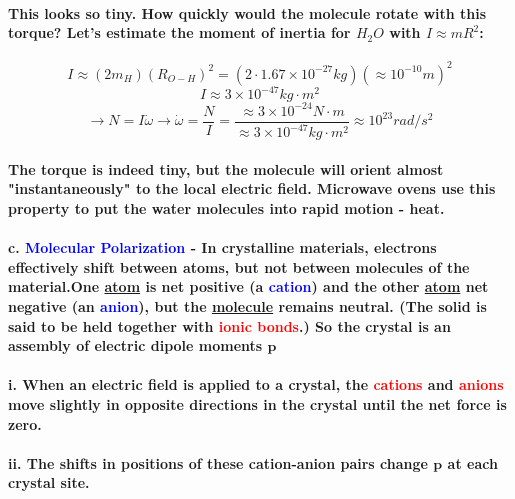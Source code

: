 \documentclass{article}
\begin{document}
\paragraph{This looks so tiny. How quickly would the molecule rotate with this torque? Let's estimate the moment of inertia for $H_2O$ with $I\approx mR^2$:}
\begin{equation*}
    I\approx (2m_{H})(R_{O-H})^2 =(2\cdot 1.67\times 10^{-27}kg)(\approx10^{-10}m)^2
\end{equation*}
\begin{equation*}
    I\approx 3\times 10^{-47} kg\cdot m^2
\end{equation*}
\begin{equation*}
    \rightarrow N=I\dot{\omega}\rightarrow \dot{\omega}=\frac{N}{I}=\frac{\approx 3\times 10^{-24}N\cdot m}{\approx 3\times10^{-47}kg\cdot m^2}\approx 10^{23} rad/s^2
\end{equation*}
\paragraph{The torque is indeed tiny, but the molecule will orient almost "instantaneously" to the local electric field. Microwave ovens use this property to put the water molecules into rapid motion - heat.}
\paragraph{c. \textcolor{blue}{ Molecular Polarization} - In crystalline materials, electrons effectively shift between atoms, but not between molecules of the material.One \underline{atom} is net positive (a \textcolor{blue}{cation}) and the other \underline{atom} net negative (an \textcolor{blue}{anion}), but the \underline{molecule} remains neutral. (The solid is said to be held together with \textcolor{red}{ionic bonds}.) So the crystal is an assembly of electric dipole moments $\boldsymbol{p}$}
\paragraph{\indent i. When an electric field is applied to a crystal, the \textcolor{red}{cations} and \textcolor{red}{anions} move slightly in opposite directions in the crystal until the net force is zero.}
\paragraph{\indent ii. The shifts in positions of these cation-anion pairs change $\boldsymbol{p}$ at each crystal site.}
\end{document}
